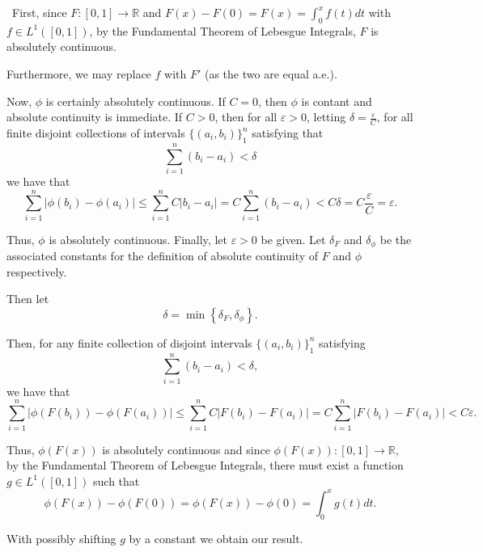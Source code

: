 \documentclass[12pt]{Qual}
\begin{document}
\begin{solution}$\,$
First, since $F:[0,1]\to\mathbb{R}$ and $F(x)-F(0)=F(x)=\int_0^xf(t)dt$ with $f\in L^1([0,1])$, by the Fundamental Theorem of Lebesgue Integrals, $F$ is absolutely continuous.

Furthermore, we may replace $f$ with $F'$ (as the two are equal a.e.).

Now, $\phi$ is certainly absolutely continuous. If $C=0$, then $\phi$ is contant and absolute continuity is immediate. If $C>0$, then for all $\varepsilon>0$, letting $\delta=\frac{\varepsilon}{C}$, for all finite disjoint collections of intervals $\{(a_i,b_i)\}_1^n$ satisfying that $$\sum_{i=1}^n(b_i-a_i)<\delta$$ we have that $$\sum_{i=1}^n|\phi(b_i)-\phi(a_i)|\le\sum_{i=1}^nC|b_i-a_i|=C\sum_{i=1}^n(b_i-a_i)<C\delta=C\frac{\varepsilon}{C}=\varepsilon.$$

Thus, $\phi$ is absolutely continuous. Finally, let $\varepsilon>0$ be given. Let $\delta_F$ and $\delta_\phi$ be the associated constants for the definition of absolute continuity of $F$ and $\phi$ respectively.

Then let $$\delta=\min\left\{\delta_F,\delta_\phi\right\}.$$

Then, for any finite collection of disjoint intervals $\{(a_i,b_i)\}_1^n$ satisfying $$\sum_{i=1}^n(b_i-a_i)<\delta,$$ we have that $$\sum_{i=1}^n|\phi(F(b_i))-\phi(F(a_i))|\le\sum_{i=1}^nC|F(b_i)-F(a_i)|=C\sum_{i=1}^n|F(b_i)-F(a_i)|<C\varepsilon.$$

Thus, $\phi(F(x))$ is absolutely continuous and since $\phi(F(x)):[0,1]\to\mathbb{R}$, by the Fundamental Theorem of Lebesgue Integrals, there must exist a function $g\in L^1([0,1])$ such that $$\phi(F(x))-\phi(F(0))=\phi(F(x))-\phi(0)=\int_0^xg(t)dt.$$

With possibly shifting $g$ by a constant we obtain our result.
\end{solution}
\vspace{0.5cm}
\end{document}
